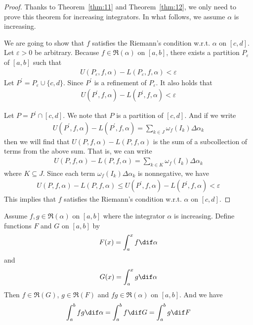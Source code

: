 \documentclass[thmcnt=section, color=blue, 12pt]{my-elegantbook}
\begin{document}
\begin{proof}
	Thanks to Theorem~\ref{thm:11} and Theorem~\ref{thm:12},
	we only need to prove this theorem for increasing integrators.
	In what follows, we assume $\alpha$ is increasing.

	We are going to show that $f$ satisfies the
	Riemann's condition w.r.t. $\alpha$ on $[c, d]$.
	Let $\varepsilon > 0$ be arbitrary.
	Because $f \in \mathfrak{R}(\alpha)$ on $[a, b]$,
	there exists a partition $P_\varepsilon$ of $[a, b]$
	such that
	\begin{align*}
		U(P_\varepsilon, f, \alpha) - L(P_\varepsilon, f, \alpha) < \varepsilon
	\end{align*}
	Let $P^\prime = P_\varepsilon \cup \{c, d\}$.
	Since $P^\prime$ is a refinement of $P_\varepsilon$.
	It also holds that
	\begin{align*}
		U(P^\prime, f, \alpha) - L(P^\prime, f, \alpha) < \varepsilon
	\end{align*}

	Let $P = P^\prime \cap [c, d]$.
	We note that $P$ is a partition of $[c, d]$.
	And if we write
	\begin{align*}
		U(P^\prime, f, \alpha) - L(P^\prime, f, \alpha)
		= \sum_{k \in J} \omega_f(I_k) \Delta \alpha_k
	\end{align*}
	then we will find that $U(P, f, \alpha) - L(P, f, \alpha)$ is
	the sum of a subcollection of terms from the above sum.
	That is, we can write
	\begin{align*}
		U(P, f, \alpha) - L(P, f, \alpha)
		= \sum_{k \in K} \omega_f(I_k) \Delta \alpha_k
	\end{align*}
	where $K \subseteq J$.
	Since each term $\omega_f(I_k) \Delta \alpha_k$ is nonnegative,
	we have
	\begin{align*}
		U(P, f, \alpha) - L(P, f, \alpha)
		\leq U(P^\prime, f, \alpha) - L(P^\prime, f, \alpha)
		< \varepsilon
	\end{align*}
	This implies that $f$ satisfies the Riemann's condition
	w.r.t. $\alpha$ on $[c, d]$.
\end{proof}

\begin{theorem} \label{thm:20}
	Assume $f, g \in \mathfrak{R}(\alpha)$ on $[a, b]$
	where the integrator $\alpha$ is increasing.
	Define functions $F$ and $G$ on $[a, b]$ by
	\begin{align*}
		F(x) = \int_a^x f \dif \alpha
	\end{align*}
	and
	\begin{align*}
		G(x) = \int_a^x g \dif \alpha
	\end{align*}
	Then $f \in \mathfrak{R}(G)$,  $g \in \mathfrak{R}(F)$
	and $fg \in \mathfrak{R}(\alpha)$ on $[a, b]$.
	And we have
	\begin{align*}
		\int_a^b f g \dif \alpha
		= \int_a^b f \dif G
		= \int_a^b g \dif F
	\end{align*}
\end{theorem}
\end{document}
